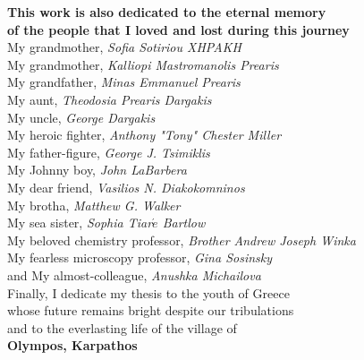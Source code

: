 \documentclass[12pt]{ucsddissertation}
\begin{document}
\begin{dedication}
\begin{center}
\vspace{0.5in}
\textbf{This work is also dedicated to the eternal memory \\of the people that I loved and lost during this journey} \\
\vspace{0.1in}
My grandmother, \textit{Sofia Sotiriou XHPAKH}\\
My grandmother, \textit{Kalliopi Mastromanolis Prearis}\\
My grandfather,  \textit{Minas Emmanuel Prearis}\\
My aunt, \textit{Theodosia Prearis Dargakis}\\
My uncle, \textit{George Dargakis}\\
My heroic fighter, \textit{Anthony "Tony" Chester Miller}\\
My father-figure, \textit{George J. Tsimiklis}\\
My Johnny boy, \textit{John LaBarbera}\\
My dear friend, \textit{Vasilios N. Diakokomninos}\\
My brotha, \textit{Matthew G. Walker}\\
My sea sister, \textit{Sophia Tiar$\acute{e}$ Bartlow}\\
My beloved chemistry professor, \textit{Brother Andrew Joseph Winka}\\
My fearless microscopy professor, \textit{Gina Sosinsky}\\
and My almost-colleague, \textit{Anushka Michailova}\\

\vspace{0.2in}
 Finally, I dedicate my thesis to the youth of Greece\\ whose future remains bright despite our tribulations\\ and to the everlasting life of the village of\\ \textbf{Olympos, Karpathos}
\end{center}

\end{dedication}
\end{document}
